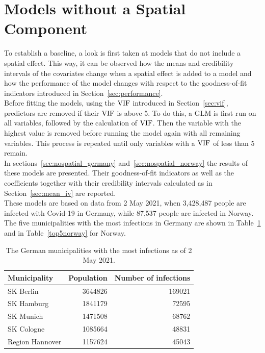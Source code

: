 \section{Models without a Spatial Component}\label{sec:nospatial}
To establish a baseline, a look is first taken at models that do not include a spatial effect. This way, it can be observed how the means and credibility intervals of the covariates change when a spatial effect is added to a model and how the performance of the model changes with respect to the goodness-of-fit indicators introduced in Section~\ref{sec:performance}. \\
Before fitting the models, using the $\hbox{VIF}$ introduced in Section~\ref{sec:vif}, predictors are removed if their $\hbox{VIF}$ is above 5. To do this, a GLM is first run on all variables, followed by the calculation of $\hbox{VIF}$. Then the variable with the highest value is removed before running the model again with all remaining variables. This process is repeated until only variables with a $\hbox{VIF}$ of less than 5 remain. \\
In sections~\ref{sec:nospatial_germany} and~\ref{sec:nospatial_norway} the results of these models are presented. Their goodness-of-fit indicators as well as the coefficients together with their credibility intervals calculated as in Section~\ref{sec:mean_iv} are reported. \\
These models are based on data from 2 May 2021, when 3,428,487 people are infected with Covid-19 in Germany, while 87,537 people are infected in Norway. The five municipalities with the most infections in Germany are shown in Table~\ref{top5germany} and in Table~\ref{top5norway} for Norway.
\begin{table}[H] 
\caption{The German municipalities with the most infections as of 2 May 2021. \label{top5germany}}
\begin{tabular}{l r r}
\toprule
\textbf{Municipality}	& \textbf{Population}	& \textbf{Number of infections} \\
\midrule
SK Berlin & 3644826 & 169021  \\   
SK Hamburg & 1841179 & 72595  \\
SK Munich & 1471508 & 68762  \\
SK Cologne & 1085664 & 48831  \\
Region Hannover & 1157624 & 45043  \\
\bottomrule
\end{tabular}
\end{table}
